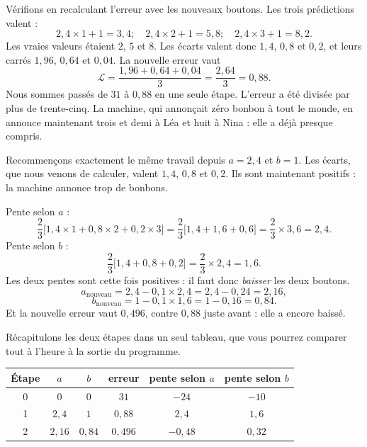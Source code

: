 \begin{exemple}
Vérifions en recalculant l'erreur avec les nouveaux boutons. Les trois
prédictions valent :
\[
  2{,}4 \times 1 + 1 = 3{,}4 ; \quad
  2{,}4 \times 2 + 1 = 5{,}8 ; \quad
  2{,}4 \times 3 + 1 = 8{,}2 .
\]
Les vraies valeurs étaient $2$, $5$ et $8$. Les écarts valent donc $1{,}4$,
$0{,}8$ et $0{,}2$, et leurs carrés $1{,}96$, $0{,}64$ et $0{,}04$. La
nouvelle erreur vaut
\[
  \mathcal{L} = \frac{1{,}96 + 0{,}64 + 0{,}04}{3}
              = \frac{2{,}64}{3} = 0{,}88 .
\]
Nous sommes passés de $31$ à $0{,}88$ en une seule étape. L'erreur a été
divisée par plus de trente-cinq. La machine, qui annonçait zéro bonbon à
tout le monde, en annonce maintenant trois et demi à Léa et huit à Nina :
elle a déjà presque compris.
\end{exemple}

\begin{exemple}
Recommençons exactement le même travail depuis $a = 2{,}4$ et $b = 1$. Les
écarts, que nous venons de calculer, valent $1{,}4$, $0{,}8$ et $0{,}2$. Ils
sont maintenant positifs : la machine annonce trop de bonbons.

Pente selon $a$ :
\[
  \frac{2}{3}\bigl[1{,}4 \times 1 + 0{,}8 \times 2 + 0{,}2 \times 3\bigr]
  = \frac{2}{3}\bigl[1{,}4 + 1{,}6 + 0{,}6\bigr]
  = \frac{2}{3} \times 3{,}6 = 2{,}4 .
\]
Pente selon $b$ :
\[
  \frac{2}{3}\bigl[1{,}4 + 0{,}8 + 0{,}2\bigr]
  = \frac{2}{3} \times 2{,}4 = 1{,}6 .
\]
Les deux pentes sont cette fois positives : il faut donc \emph{baisser} les
deux boutons.
\[
  a_{\text{nouveau}} = 2{,}4 - 0{,}1 \times 2{,}4 = 2{,}4 - 0{,}24 = 2{,}16 ,
\]
\[
  b_{\text{nouveau}} = 1 - 0{,}1 \times 1{,}6 = 1 - 0{,}16 = 0{,}84 .
\]
Et la nouvelle erreur vaut $0{,}496$, contre $0{,}88$ juste avant : elle a
encore baissé.
\end{exemple}

Récapitulons les deux étapes dans un seul tableau, que vous pourrez
comparer tout à l'heure à la sortie du programme.

\begin{center}
\begin{tabular}{cccccc}
\toprule
\textbf{Étape} & $a$ & $b$ & \textbf{erreur} &
\textbf{pente selon } $a$ & \textbf{pente selon } $b$ \\
\midrule
0 & $0$      & $0$      & $31$      & $-24$   & $-10$  \\
1 & $2{,}4$  & $1$      & $0{,}88$  & $2{,}4$ & $1{,}6$ \\
2 & $2{,}16$ & $0{,}84$ & $0{,}496$ & $-0{,}48$ & $0{,}32$ \\
\bottomrule
\end{tabular}
\end{center}

